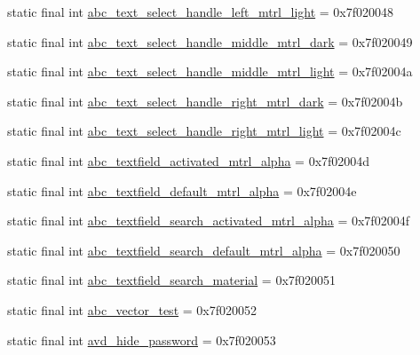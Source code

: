 \begin{CompactItemize}
\item 
static final int \hyperlink{classandroid_1_1support_1_1v4_1_1_r_1_1drawable_b91123f211685331e252e2ab59d8fdda}{abc\_\-text\_\-select\_\-handle\_\-left\_\-mtrl\_\-light} = 0x7f020048
\item 
static final int \hyperlink{classandroid_1_1support_1_1v4_1_1_r_1_1drawable_4cbc5559d7817ecd2829f3d19f692763}{abc\_\-text\_\-select\_\-handle\_\-middle\_\-mtrl\_\-dark} = 0x7f020049
\item 
static final int \hyperlink{classandroid_1_1support_1_1v4_1_1_r_1_1drawable_6a367670daab830bdc30437928ca8e80}{abc\_\-text\_\-select\_\-handle\_\-middle\_\-mtrl\_\-light} = 0x7f02004a
\item 
static final int \hyperlink{classandroid_1_1support_1_1v4_1_1_r_1_1drawable_c47c85f098b1793bd268d17b5a3b82d1}{abc\_\-text\_\-select\_\-handle\_\-right\_\-mtrl\_\-dark} = 0x7f02004b
\item 
static final int \hyperlink{classandroid_1_1support_1_1v4_1_1_r_1_1drawable_0c1113f004f9ab51e31cfee151abc5f5}{abc\_\-text\_\-select\_\-handle\_\-right\_\-mtrl\_\-light} = 0x7f02004c
\item 
static final int \hyperlink{classandroid_1_1support_1_1v4_1_1_r_1_1drawable_3d201ffacb4dfb79be4187e800c55c75}{abc\_\-textfield\_\-activated\_\-mtrl\_\-alpha} = 0x7f02004d
\item 
static final int \hyperlink{classandroid_1_1support_1_1v4_1_1_r_1_1drawable_2884495f41ff0948345ff7c2ba43fbd2}{abc\_\-textfield\_\-default\_\-mtrl\_\-alpha} = 0x7f02004e
\item 
static final int \hyperlink{classandroid_1_1support_1_1v4_1_1_r_1_1drawable_2c835009a2ab39951b066eb14c1715dc}{abc\_\-textfield\_\-search\_\-activated\_\-mtrl\_\-alpha} = 0x7f02004f
\item 
static final int \hyperlink{classandroid_1_1support_1_1v4_1_1_r_1_1drawable_c1970ca7efd36796d567c3b2276d40cb}{abc\_\-textfield\_\-search\_\-default\_\-mtrl\_\-alpha} = 0x7f020050
\item 
static final int \hyperlink{classandroid_1_1support_1_1v4_1_1_r_1_1drawable_e92076b8f654f4da61279f171791d6bb}{abc\_\-textfield\_\-search\_\-material} = 0x7f020051
\item 
static final int \hyperlink{classandroid_1_1support_1_1v4_1_1_r_1_1drawable_d775d540da138c934c9fd4f3f2ebf13b}{abc\_\-vector\_\-test} = 0x7f020052
\item 
static final int \hyperlink{classandroid_1_1support_1_1v4_1_1_r_1_1drawable_55ef914c192fe92dfa358d1032b03a29}{avd\_\-hide\_\-password} = 0x7f020053

\end{CompactItemize}
